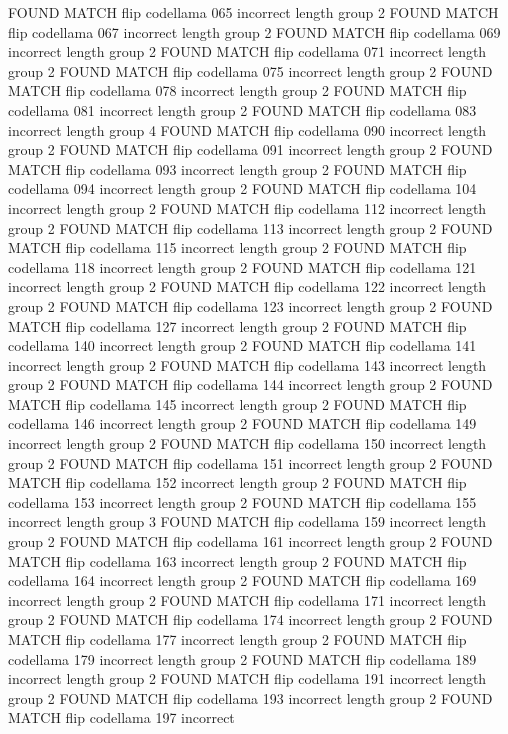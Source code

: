 FOUND MATCH flip codellama 065 incorrect
length group  2
FOUND MATCH flip codellama 067 incorrect
length group  2
FOUND MATCH flip codellama 069 incorrect
length group  2
FOUND MATCH flip codellama 071 incorrect
length group  2
FOUND MATCH flip codellama 075 incorrect
length group  2
FOUND MATCH flip codellama 078 incorrect
length group  2
FOUND MATCH flip codellama 081 incorrect
length group  2
FOUND MATCH flip codellama 083 incorrect
length group  4
FOUND MATCH flip codellama 090 incorrect
length group  2
FOUND MATCH flip codellama 091 incorrect
length group  2
FOUND MATCH flip codellama 093 incorrect
length group  2
FOUND MATCH flip codellama 094 incorrect
length group  2
FOUND MATCH flip codellama 104 incorrect
length group  2
FOUND MATCH flip codellama 112 incorrect
length group  2
FOUND MATCH flip codellama 113 incorrect
length group  2
FOUND MATCH flip codellama 115 incorrect
length group  2
FOUND MATCH flip codellama 118 incorrect
length group  2
FOUND MATCH flip codellama 121 incorrect
length group  2
FOUND MATCH flip codellama 122 incorrect
length group  2
FOUND MATCH flip codellama 123 incorrect
length group  2
FOUND MATCH flip codellama 127 incorrect
length group  2
FOUND MATCH flip codellama 140 incorrect
length group  2
FOUND MATCH flip codellama 141 incorrect
length group  2
FOUND MATCH flip codellama 143 incorrect
length group  2
FOUND MATCH flip codellama 144 incorrect
length group  2
FOUND MATCH flip codellama 145 incorrect
length group  2
FOUND MATCH flip codellama 146 incorrect
length group  2
FOUND MATCH flip codellama 149 incorrect
length group  2
FOUND MATCH flip codellama 150 incorrect
length group  2
FOUND MATCH flip codellama 151 incorrect
length group  2
FOUND MATCH flip codellama 152 incorrect
length group  2
FOUND MATCH flip codellama 153 incorrect
length group  2
FOUND MATCH flip codellama 155 incorrect
length group  3
FOUND MATCH flip codellama 159 incorrect
length group  2
FOUND MATCH flip codellama 161 incorrect
length group  2
FOUND MATCH flip codellama 163 incorrect
length group  2
FOUND MATCH flip codellama 164 incorrect
length group  2
FOUND MATCH flip codellama 169 incorrect
length group  2
FOUND MATCH flip codellama 171 incorrect
length group  2
FOUND MATCH flip codellama 174 incorrect
length group  2
FOUND MATCH flip codellama 177 incorrect
length group  2
FOUND MATCH flip codellama 179 incorrect
length group  2
FOUND MATCH flip codellama 189 incorrect
length group  2
FOUND MATCH flip codellama 191 incorrect
length group  2
FOUND MATCH flip codellama 193 incorrect
length group  2
FOUND MATCH flip codellama 197 incorrect
